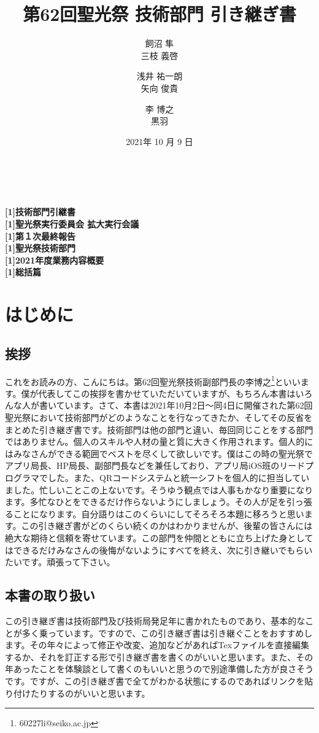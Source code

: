 \documentclass[dvipdfmx,11pt]{jarticle}
\title{第62回聖光祭 技術部門 引き継ぎ書}
\author{飼沼 隼 \\ 三枝 義啓 \and 浅井 祐一朗 \\ 矢向 俊貴 \and 李 博之 \\ 黒羽 }
\date{2021年 10 月 9 日}
\begin{document}
\begin{center}

\textbf {
\vspace{8.5cm}
\\
\Ovalbox{\fontsize{33pt}{20pt}\selectfont \scalebox{1.05}[1]{超機密}}\\
\fontsize{50pt}{60pt}\selectfont \scalebox{1.05}[1]{技術部門引継書}\\
\fontsize{12pt}{30pt}\selectfont \scalebox{1.05}[1]{聖光祭実行委員会 拡大実行会議}\\
\fontsize{35pt}{35pt}\selectfont \scalebox{1.05}[1]{第１次最終報告}\\
\fontsize{12pt}{25pt}\selectfont \scalebox{1.05}[1]{聖光祭技術部門}\\
\fontsize{12pt}{15pt}\selectfont \scalebox{1.05}[1]{2021年度業務内容概要}\\
\fontsize{12pt}{20pt}\selectfont \scalebox{1.05}[1]{総括篇}\\
}
\end{center}
\pagebreak
\section{はじめに}
\subsection{挨拶}
これをお読みの方、こんにちは。第62回聖光祭技術副部門長の李博之\footnote{60227li@seiko.ac.jp}といいます。僕が代表してこの挨拶を書かせていただいていますが、もちろん本書はいろんな人が書いています。さて、本書は2021年10月2日〜同4日に開催された第62回聖光祭において技術部門がどのようなことを行なってきたか、そしてその反省をまとめた引き継ぎ書です。技術部門は他の部門と違い、毎回同じことをする部門ではありません。個人のスキルや人材の量と質に大きく作用されます。個人的にはみなさんができる範囲でベストを尽くして欲しいです。僕はこの時の聖光祭でアプリ局長、HP局長、副部門長などを兼任しており、アプリ局iOS班のリードプログラマでした。また、QRコードシステムと統一シフトを個人的に担当していました。忙しいことこの上ないです。そうゆう観点では人事もかなり重要になります。多忙なひとをできるだけ作らないようにしましょう。その人が足を引っ張ることになります。自分語りはこのくらいにしてそろそろ本題に移ろうと思います。この引き継ぎ書がどのくらい続くのかはわかりませんが、後輩の皆さんには絶大な期待と信頼を寄せています。この部門を仲間とともに立ち上げた身としてはできるだけみなさんの後悔がないようにすべてを終え、次に引き継いでもらいたいです。頑張って下さい。
\subsection{本書の取り扱い}
この引き継ぎ書は技術部門及び技術局発足年に書かれたものであり、基本的なことが多く乗っています。ですので、この引き継ぎ書は引き継ぐことをおすすめします。その年々によって修正や改変、追加などがあればTexファイルを直接編集するか、それを訂正する形で引き継ぎ書を書くのがいいと思います。また、その年あったことを体験談として書くのもいいと思うので別途準備した方が良さそうです。ですが、この引き継ぎ書で全てがわかる状態にするのであればリンクを貼り付けたりするのがいいと思います。
\end{document}
